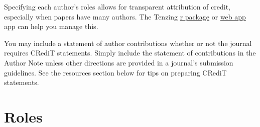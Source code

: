 \documentclass[
  oneside]{book}
\begin{document}
Specifying each author's roles allows for transparent attribution of credit, especially when papers have many authors. The Tenzing \href{https://marton-balazs-kovacs.github.io/tenzing/}{r package} or \href{https://tenzing.club/}{web app} app can help you manage this.

You may include a statement of author contributions whether or not the journal requires CRediT statements. Simply include the statement of contributions in the Author Note unless other directions are provided in a journal's submission guidelines. See the resources section below for tips on preparing CRediT statements.

\hypertarget{roles-1}{%
\section{Roles}\label{roles-1}}
\end{document}
